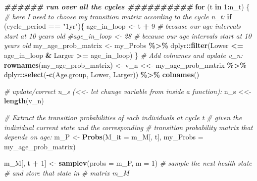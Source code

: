 \documentclass[
]{article}
\newenvironment{Shaded}{\begin{snugshade}}{\end{snugshade}}
\newcommand{\AttributeTok}[1]{\textcolor[rgb]{0.13,0.29,0.53}{#1}}
\newcommand{\CommentTok}[1]{\textcolor[rgb]{0.56,0.35,0.01}{\textit{#1}}}
\newcommand{\ControlFlowTok}[1]{\textcolor[rgb]{0.13,0.29,0.53}{\textbf{#1}}}
\newcommand{\DecValTok}[1]{\textcolor[rgb]{0.00,0.00,0.81}{#1}}
\newcommand{\DocumentationTok}[1]{\textcolor[rgb]{0.56,0.35,0.01}{\textbf{\textit{#1}}}}
\newcommand{\FunctionTok}[1]{\textcolor[rgb]{0.13,0.29,0.53}{\textbf{#1}}}
\newcommand{\NormalTok}[1]{#1}
\newcommand{\OtherTok}[1]{\textcolor[rgb]{0.56,0.35,0.01}{#1}}
\newcommand{\SpecialCharTok}[1]{\textcolor[rgb]{0.81,0.36,0.00}{\textbf{#1}}}
\newcommand{\StringTok}[1]{\textcolor[rgb]{0.31,0.60,0.02}{#1}}
\begin{document}
\begin{Shaded}
\begin{Highlighting}[]
  \DocumentationTok{\#\#\#\#\#\# run over all the cycles \#\#\#\#\#\#\#\#\#\# }
  \ControlFlowTok{for}\NormalTok{ (t }\ControlFlowTok{in} \DecValTok{1}\SpecialCharTok{:}\NormalTok{n\_t) \{}
    \CommentTok{\# here I need to choose my transition matrix according to the cycle n\_t:}
    \ControlFlowTok{if}\NormalTok{ (cycle\_period }\SpecialCharTok{==} \StringTok{"1yr"}\NormalTok{)\{}
\NormalTok{      age\_in\_loop }\OtherTok{\textless{}{-}}\NormalTok{ t }\SpecialCharTok{+} \DecValTok{9} \CommentTok{\# because our age intervals start at 10 years old}
      \CommentTok{\#age\_in\_loop \textless{}{-}  28 \# because our age intervals start at 10 years old}
\NormalTok{      my\_age\_prob\_matrix }\OtherTok{\textless{}{-}}\NormalTok{ my\_Probs }\SpecialCharTok{\%\textgreater{}\%} 
\NormalTok{        dplyr}\SpecialCharTok{::}\FunctionTok{filter}\NormalTok{(Lower }\SpecialCharTok{\textless{}=}\NormalTok{ age\_in\_loop }\SpecialCharTok{\&}\NormalTok{ Larger }\SpecialCharTok{\textgreater{}=}\NormalTok{ age\_in\_loop) }
\NormalTok{    \}}
    \CommentTok{\# Add colnames and update \textasciigrave{}v\_n\textasciigrave{}:}
    \FunctionTok{rownames}\NormalTok{(my\_age\_prob\_matrix) }\OtherTok{\textless{}{-}}\NormalTok{ v\_n }\OtherTok{\textless{}\textless{}{-}} 
\NormalTok{      my\_age\_prob\_matrix }\SpecialCharTok{\%\textgreater{}\%}
\NormalTok{      dplyr}\SpecialCharTok{::}\FunctionTok{select}\NormalTok{(}\SpecialCharTok{{-}}\FunctionTok{c}\NormalTok{(Age.group, Lower, Larger)) }\SpecialCharTok{\%\textgreater{}\%} 
      \FunctionTok{colnames}\NormalTok{()}
    
    \CommentTok{\# update/correct n\_s (\textless{}\textless{}{-} let change variable from inside a function):}
\NormalTok{    n\_s  }\OtherTok{\textless{}\textless{}{-}} \FunctionTok{length}\NormalTok{(v\_n)  }
    
    \CommentTok{\# Extract the transition probabilities of each individuals at cycle t}
    \CommentTok{\# given the individual current state and the corresponding }
    \CommentTok{\# transition probability matrix that depends on age:}
\NormalTok{    m\_P }\OtherTok{\textless{}{-}} \FunctionTok{Probs}\NormalTok{(}\AttributeTok{M\_it =}\NormalTok{  m\_M[, t], }\AttributeTok{my\_Probs =}\NormalTok{ my\_age\_prob\_matrix)}
    
\NormalTok{    m\_M[, t }\SpecialCharTok{+} \DecValTok{1}\NormalTok{] }\OtherTok{\textless{}{-}} \FunctionTok{samplev}\NormalTok{(}\AttributeTok{probs =}\NormalTok{ m\_P, }\AttributeTok{m =} \DecValTok{1}\NormalTok{)  }\CommentTok{\# sample the next health state }
    \CommentTok{\# and store that state in }
    \CommentTok{\# matrix m\_M }
    

\end{Highlighting}
\end{Shaded}
\end{document}
